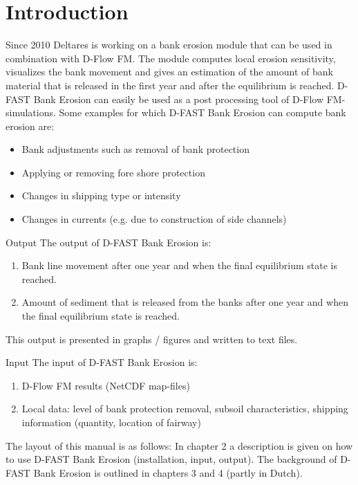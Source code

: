 \chapter{Introduction}

Since 2010 Deltares is working on a bank erosion module that can be used in combination with D-Flow FM.
The module computes local erosion sensitivity, visualizes the bank movement and gives an estimation of the amount of bank material that is released in the first year and after the equilibrium is reached.
D-FAST Bank Erosion can easily be used as a post processing tool of D-Flow FM-simulations.
Some examples for which D-FAST Bank Erosion can compute bank erosion are:

\begin{itemize}
\item Bank adjustments such as removal of bank protection
\item Applying or removing fore shore protection
\item Changes in shipping type or intensity
\item Changes in currents (e.g. due to construction of side channels)
\end{itemize}

Output
The output of D-FAST Bank Erosion is:

\begin{enumerate}
\item Bank line movement after one year and when the final equilibrium state is reached.
\item Amount of sediment that is released from the banks after one year and when the final equilibrium state is reached.
\end{enumerate}

This output is presented in graphs / figures and written to text files.

Input
The input of D-FAST Bank Erosion is:

\begin{enumerate}
\item D-Flow FM results (NetCDF map-files)
\item Local data: level of bank protection removal, subsoil characteristics, shipping information (quantity, location of fairway)
\end{enumerate}

The layout of this manual is as follows: In chapter 2 a description is given on how to use D-FAST Bank Erosion (installation, input, output).
The background of D-FAST Bank Erosion is outlined in chapters 3 and 4 (partly in Dutch).

